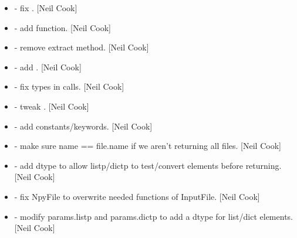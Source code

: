 \documentclass[a4paper,10pt,english]{report}
\begin{document}
\begin{itemize}
\item {} 
 - fix . {[}Neil Cook{]}

\item {} 
 - add  function. {[}Neil Cook{]}

\item {} 
 - remove extract method. {[}Neil Cook{]}

\item {} 
 - add . {[}Neil Cook{]}

\item {} 
 - fix types in calls.
{[}Neil Cook{]}

\item {} 
 - tweak . {[}Neil Cook{]}

\item {} 
 - add  constants/keywords. {[}Neil Cook{]}

\item {} 
 - make sure name == file.name if we aren’t returning
all files. {[}Neil Cook{]}

\item {} 
 - add dtype to allow listp/dictp to test/convert elements
before returning. {[}Neil Cook{]}

\item {} 
 - fix NpyFile to overwrite needed functions of InputFile.
{[}Neil Cook{]}

\item {} 
 - modify params.listp and
params.dictp to add a dtype for list/dict elements. {[}Neil Cook{]}

\end{itemize}
\end{document}
